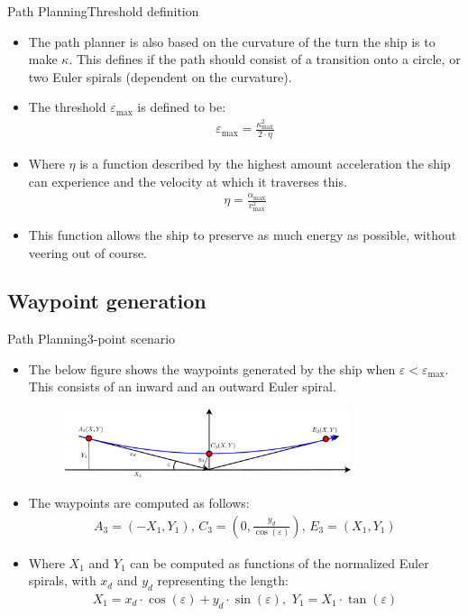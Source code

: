 \documentclass[10pt]{beamer}
\begin{document}
\begin{frame}{Path Planning}{Threshold definition}
    \begin{itemize}
    	\item The path planner is also based on the curvature of the turn the ship is to make $\kappa$. This defines if the path should consist of a transition onto a circle, or two Euler spirals (dependent on the curvature).
    	\item The threshold $\varepsilon_\text{max}$ is defined to be:
    	\begin{align}
    	\varepsilon_\text{max} = \frac{\kappa_\text{max}^2}{2 \cdot \eta}
    	\end{align}
    	\item Where $\eta$ is a function described by the highest amount acceleration the ship can experience and the velocity at which it traverses this.
    	\begin{align}
    	\eta = \frac{\alpha_\text{max}}{v^2_\text{max}}
    	\end{align}
    	\item This function allows the ship to preserve as much energy as possible, without veering out of course.
    \end{itemize}
\end{frame}

\subsection{Waypoint generation}
\begin{frame}{Path Planning}{3-point scenario}
    \begin{itemize}
    \item The below figure shows the waypoints generated by the ship when $\varepsilon < \varepsilon_\text{max}$. This consists of an inward and an outward Euler spiral. 
    	\begin{figure}
			\begin{center}
				\includegraphics[width=8.4cm]{img/3Points} %
				\label{fig:3points}
			\end{center}
		\end{figure}
		\item The waypoints are computed as follows:
		\begin{align}
		A_3 = (-X_1,Y_1),\, C_3 = (0,\frac{y_d}{\cos(\varepsilon)}),\, E_3 = (X_1,Y_1)
		\end{align}
		\item Where $X_1$ and $Y_1$ can be computed as functions of the normalized Euler spirals, with $x_d$ and $y_d$ representing the length:
		\begin{align}
X_1 = x_d \cdot \cos(\varepsilon) + y_d \cdot \sin(\varepsilon),\,\, Y_1 = X_1 \cdot \tan(\varepsilon)
		\end{align}
    \end{itemize}
\end{frame}
\end{document}
